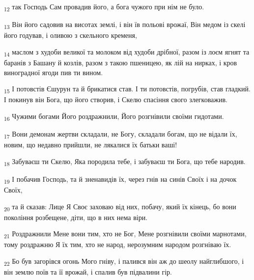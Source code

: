 \begin{tcolorbox}
\textsubscript{12} так Господь Сам провадив його, а бога чужого при нім не було.
\end{tcolorbox}
\begin{tcolorbox}
\textsubscript{13} Він його садовив на висотах землі, і він їв польові врожаї, Він медом із скелі його годував, і оливою з скельного кременя,
\end{tcolorbox}
\begin{tcolorbox}
\textsubscript{14} маслом з худоби великої та молоком від худоби дрібної, разом із лоєм ягнят та баранів з Башану й козлів, разом з такою пшеницею, як лій на нирках, і кров виноградної ягоди пив ти вином.
\end{tcolorbox}
\begin{tcolorbox}
\textsubscript{15} І потовстів Єшурун та й брикатися став. І ти потовстів, погрубів, став гладкий. І покинув він Бога, що його створив, і Скелю спасіння свого злегковажив.
\end{tcolorbox}
\begin{tcolorbox}
\textsubscript{16} Чужими богами Його роздражнили, Його розгнівили своїми гидотами.
\end{tcolorbox}
\begin{tcolorbox}
\textsubscript{17} Вони демонам жертви складали, не Богу, складали богам, що не відали їх, новим, що недавно прийшли, не лякалися їх батьки ваші!
\end{tcolorbox}
\begin{tcolorbox}
\textsubscript{18} Забуваєш ти Скелю, Яка породила тебе, і забуваєш ти Бога, що тебе народив.
\end{tcolorbox}
\begin{tcolorbox}
\textsubscript{19} І побачив Господь, та й зненавидів їх, через гнів на синів Своїх і на дочок Своїх,
\end{tcolorbox}
\begin{tcolorbox}
\textsubscript{20} та й сказав: Лице Я Своє заховаю від них, побачу, який їх кінець, бо вони покоління розбещене, діти, що в них нема віри.
\end{tcolorbox}
\begin{tcolorbox}
\textsubscript{21} Роздражнили Мене вони тим, хто не Бог, Мене розгнівили своїми марнотами, тому роздражню Я їх тим, хто не народ, нерозумним народом розгніваю їх.
\end{tcolorbox}
\begin{tcolorbox}
\textsubscript{22} Бо був загорівся огонь Мого гніву, і палився він аж до шеолу найглибшого, і він землю поїв та її врожай, і спалив був підвалини гір.
\end{tcolorbox}
